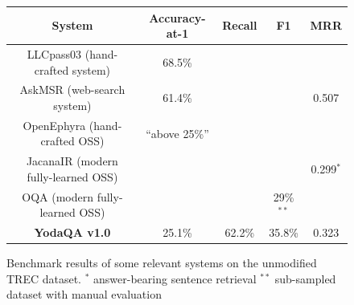 \begin{figure}[t]
\centering
\begin{tabular}{|c|cccc|}
\hline
System & Accuracy-at-1 & Recall & F1 & MRR \\ \hline
LLCpass03 \citep{LCC} (hand-crafted system) & 68.5\% & & & \\
AskMSR \citep{AskMSR} (web-search system) & 61.4\% & & & 0.507 \\ \hline
OpenEphyra \citep{Ephyra2006} (hand-crafted OSS) & ``above 25\%'' & & & \\
JacanaIR \citep{TreeEditIR2013Yao} (modern fully-learned OSS) & & & & 0.299$^*$ \\
OQA \citep{OQA} (modern fully-learned OSS) & & & 29\%$^{**}$ & \\ \hline
\textbf{YodaQA v1.0} & 25.1\% & 62.2\% & 35.8\% & 0.323 \\
\hline
\end{tabular}
\vspace*{-0.2cm}
\caption{Benchmark results of some relevant systems on the unmodified TREC dataset.\quad
$^*$ answer-bearing sentence retrieval\quad
$^{**}$ sub-sampled dataset with manual evaluation}
\label{fig:bench}
\end{figure}



